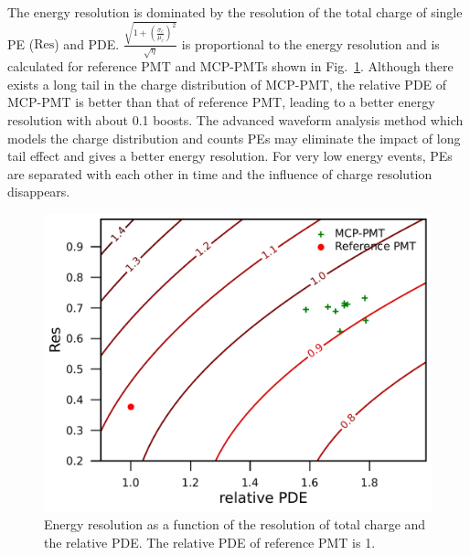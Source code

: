 The energy resolution is dominated by the resolution of the total charge of single PE ($\mathrm{Res}$) and PDE. $\frac{\sqrt{1+(\frac{\sigma_c}{\mu_c})^2}}{\sqrt{\eta}}$ is proportional to the energy resolution and is calculated for reference PMT and MCP-PMTs shown in Fig.~\ref{fig:EnergyResolution}. Although there exists a long tail in the charge distribution of MCP-PMT, the relative PDE of MCP-PMT is better than that of reference PMT, leading to a better energy resolution with about 0.1 boosts. The advanced waveform analysis method which models the charge distribution and counts PEs may eliminate the impact of long tail effect and gives a better energy resolution. For very low energy events, PEs are separated with each other in time and the influence of charge resolution disappears.
\begin{figure}[!htbp]
    \centering
    \includegraphics[width=\MF\textwidth]{figures/result/resolution.pdf}
    \caption{Energy resolution as a function of the resolution of total charge and the relative PDE. The relative PDE of reference PMT is 1.}
    \label{fig:EnergyResolution}
\end{figure}
